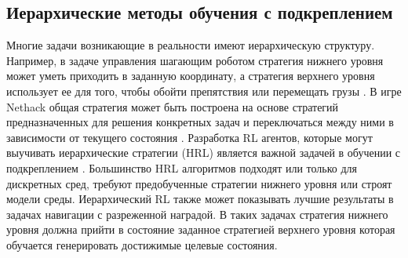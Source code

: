 

\subsection{Иерархические методы обучения с подкреплением}

Многие задачи возникающие в реальности имеют иерархическую структуру. Например, в задаче управления шагающим роботом стратегия нижнего уровня может уметь приходить в заданную координату, а стратегия верхнего уровня использует ее для того, чтобы обойти препятствия или перемещать грузы \cite{robel}. В игре Nethack общая стратегия может быть построена на основе стратегий предназначенных для решения конкретных задач и переключаться между ними в зависимости от текущего состояния \cite{confbib3}. Разработка RL агентов, которые могут выучивать иерархические стратегии (HRL) является важной задачей в обучении с подкреплением \cite{Sutton1999, dietterich2000hierarchical, mcGovern}. Большинство HRL алгоритмов подходят или только для дискретных сред, требуют предобученные стратегии нижнего уровня или строят модели среды. Иерархический RL также может показывать лучшие результаты в задачах навигации с разреженной наградой. В таких задачах стратегия нижнего уровня должна прийти в состояние заданное стратегией верхнего уровня которая обучается генерировать достижимые целевые состояния. 

